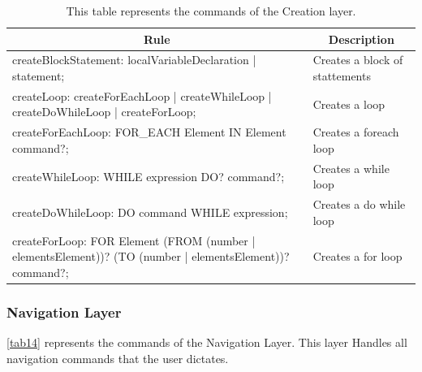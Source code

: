 \begin{table}[H]
	\centering
	\begin{tabular}{|p{8cm}|p{7cm}|}
		\hline
		\multicolumn{1}{|c|}{{\bf Rule}} & \multicolumn{1}{c|}{{\bf Description}} \\ \hline
		createBlockStatement: localVariableDeclaration | statement;                                                                                             & Creates a block of stattements         \\ \hline
		createLoop: createForEachLoop | createWhileLoop | createDoWhileLoop | createForLoop;                                                                    & Creates a loop                         \\ \hline
		createForEachLoop: FOR\_EACH Element IN Element command?;                                                                                               & Creates a foreach loop                 \\ \hline
		createWhileLoop: WHILE expression DO? command?;                                                                                                         & Creates a while loop                   \\ \hline
		createDoWhileLoop: DO command WHILE expression;                                                                                                         & Creates a do while loop                \\ \hline
		createForLoop: FOR Element (FROM (number | elementsElement))? (TO (number | elementsElement))? command?;                                                & Creates a for loop                     \\ \hline
	\end{tabular}
	\caption{This table represents the commands of the Creation layer.}
	\label{tab13}
\end{table}
\subsubsection{Navigation Layer}
\autoref{tab14} represents the commands of the Navigation Layer.  This layer Handles all navigation commands that the user dictates.

